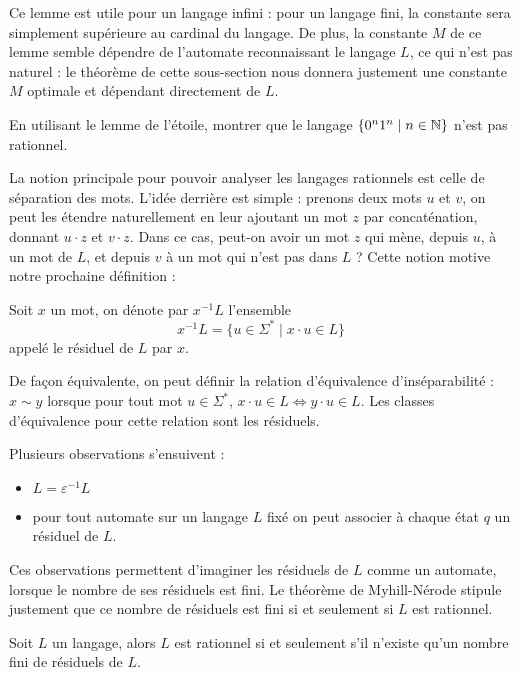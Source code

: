 \begin{rmk}
    Ce lemme est utile pour un langage infini : pour un langage fini, la constante sera simplement supérieure au cardinal du langage. De plus, la constante $M$ de ce lemme semble dépendre de l'automate reconnaissant le langage $L$, ce qui n'est pas naturel : le théorème de cette sous-section nous donnera justement une constante $M$ optimale et dépendant directement de $L$.
\end{rmk}

\begin{exo}
    En utilisant le lemme de l'étoile, montrer que le langage $\{0^n1^n\mid n\in\mathbb{N}\}$ n'est pas rationnel.
\end{exo}

La notion principale pour pouvoir analyser les langages rationnels est celle de séparation des mots. L'idée derrière est simple : prenons deux mots $u$ et $v$, on peut les étendre naturellement en leur ajoutant un mot $z$ par concaténation, donnant $u\cdot z$ et $v\cdot z$. Dans ce cas, peut-on avoir un mot $z$ qui mène, depuis $u$, à un mot de $L$, et depuis $v$ à un mot qui n'est pas dans $L$ ? Cette notion motive notre prochaine définition :

\begin{defi}
    Soit $x$ un mot, on dénote par $x^{-1}L$ l'ensemble $$x^{-1}L=\{u\in \Sigma^*\mid x\cdot u \in L\}$$ appelé le résiduel de $L$ par $x$.

    De façon équivalente, on peut définir la relation d'équivalence d'inséparabilité : $x\sim y$ lorsque pour tout mot $u\in \Sigma^*$, $x\cdot u \in L \iff y\cdot u \in L$. Les classes d'équivalence pour cette relation sont les résiduels.
\end{defi}

Plusieurs observations s'ensuivent :
\begin{itemize}[label=$\bullet$]
    \item $L=\varepsilon^{-1}L$
    \item pour tout automate sur un langage $L$ fixé on peut associer à chaque état $q$ un résiduel de $L$.
\end{itemize}

Ces observations permettent d'imaginer les résiduels de $L$ comme un automate, lorsque le nombre de ses résiduels est fini. Le théorème de Myhill-Nérode stipule justement que ce nombre de résiduels est fini si et seulement si $L$ est rationnel.

\begin{them}
    Soit $L$ un langage, alors $L$ est rationnel si et seulement s'il n'existe qu'un nombre fini de résiduels de $L$.
\end{them}

